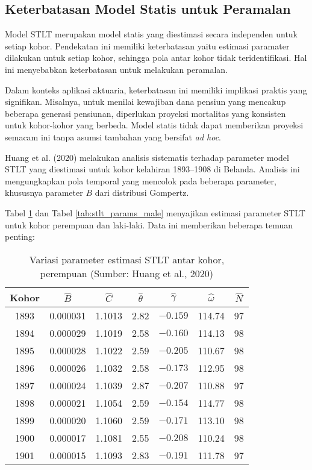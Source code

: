 \subsection{Keterbatasan Model Statis untuk Peramalan}

Model STLT merupakan model statis yang diestimasi secara independen untuk setiap kohor. Pendekatan ini memiliki keterbatasan yaitu estimasi paramater dilakukan untuk setiap kohor, sehingga pola antar kohor tidak teridentifikasi. Hal ini menyebabkan keterbatasan untuk melakukan peramalan.

Dalam konteks aplikasi aktuaria, keterbatasan ini memiliki implikasi praktis yang signifikan. Misalnya, untuk menilai kewajiban dana pensiun yang mencakup beberapa generasi pensiunan, diperlukan proyeksi mortalitas yang konsisten untuk kohor-kohor yang berbeda. Model statis tidak dapat memberikan proyeksi semacam ini tanpa asumsi tambahan yang bersifat \textit{ad hoc}.

Huang et al. (2020) melakukan analisis sistematis terhadap parameter model STLT yang diestimasi untuk kohor kelahiran 1893--1908 di Belanda. Analisis ini mengungkapkan pola temporal yang mencolok pada beberapa parameter, khususnya parameter $B$ dari distribusi Gompertz.

Tabel \ref{tab:stlt_params_female} dan Tabel \ref{tab:stlt_params_male} menyajikan estimasi parameter STLT untuk kohor perempuan dan laki-laki. Data ini memberikan beberapa temuan penting:

\begin{table}[H]
\centering
\caption{Variasi parameter estimasi STLT antar kohor, perempuan (Sumber: Huang et al., 2020)}
\label{tab:stlt_params_female}
\begin{tabular}{ccccccc}
\hline
Kohor & $\hat{B}$ & $\hat{C}$ & $\hat{\theta}$ & $\hat{\gamma}$ & $\hat{\omega}$ & $\hat{N}$ \\
\hline
1893 & 0.000031 & 1.1013 & 2.82 & $-0.159$ & 114.74 & 97 \\
1894 & 0.000029 & 1.1019 & 2.58 & $-0.160$ & 114.13 & 98 \\
1895 & 0.000028 & 1.1022 & 2.59 & $-0.205$ & 110.67 & 98 \\
1896 & 0.000026 & 1.1032 & 2.58 & $-0.173$ & 112.95 & 98 \\
1897 & 0.000024 & 1.1039 & 2.87 & $-0.207$ & 110.88 & 97 \\
1898 & 0.000021 & 1.1054 & 2.59 & $-0.154$ & 114.77 & 98 \\
1899 & 0.000020 & 1.1060 & 2.59 & $-0.171$ & 113.10 & 98 \\
1900 & 0.000017 & 1.1081 & 2.55 & $-0.208$ & 110.24 & 98 \\
1901 & 0.000015 & 1.1093 & 2.83 & $-0.191$ & 111.78 & 97 \\
\hline
\end{tabular}
\end{table}

